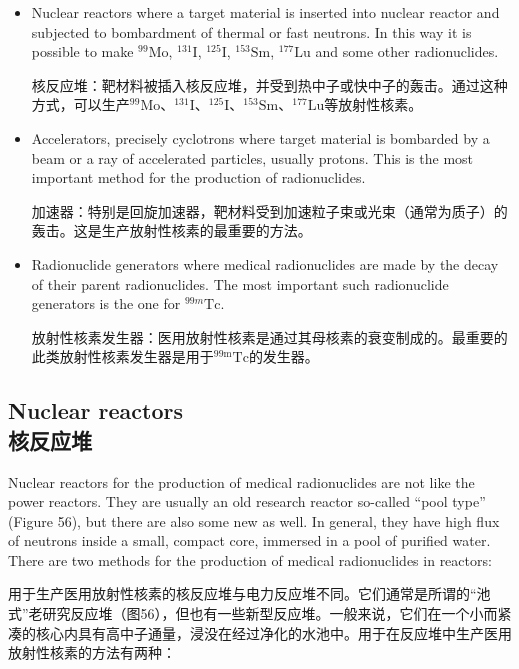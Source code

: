 \documentclass[dvipsnames, svgnames,a4paper,11pt]{article}
\begin{document}
\begin{itemize}
      \item Nuclear reactors where a target material is inserted into nuclear reactor and subjected to bombardment of thermal or fast neutrons. In this way it is possible to make $^{99}\mathrm{Mo}$, $^{131}\mathrm{I}$, $^{125}\mathrm{I}$, $^{153}\mathrm{Sm}$, $^{177}\mathrm{Lu}$ and some other radionuclides.

            核反应堆：靶材料被插入核反应堆，并受到热中子或快中子的轰击。通过这种方式，可以生产$^{99}\mathrm{Mo}$、$^{131}\mathrm{I}$、$^{125}\mathrm{I}$、$^{153}\mathrm{Sm}$、$^{177}\mathrm{Lu}$等放射性核素。

      \item Accelerators, precisely cyclotrons where target material is bombarded by a beam or a ray of accelerated particles, usually protons. This is the most important method for the production of radionuclides.

            加速器：特别是回旋加速器，靶材料受到加速粒子束或光束（通常为质子）的轰击。这是生产放射性核素的最重要的方法。

            
      \item Radionuclide generators where medical radionuclides are made by the decay of their parent radionuclides. The most important such radionuclide generators is the one for $^{99m}\mathrm{Tc}$.

            放射性核素发生器：医用放射性核素是通过其母核素的衰变制成的。最重要的此类放射性核素发生器是用于$^\text{99m}\mathrm{Tc}$的发生器。
\end{itemize}

\subsection{Nuclear reactors\\ 核反应堆}

Nuclear reactors for the production of medical radionuclides are not like the power reactors. They are usually an old research reactor so-called “pool type” (Figure 56), but there are also some new as well. In general, they have high flux of neutrons inside a small, compact core, immersed in a pool of purified water. There are two methods for the production of medical radionuclides in reactors:

用于生产医用放射性核素的核反应堆与电力反应堆不同。它们通常是所谓的“池式”老研究反应堆（图56），但也有一些新型反应堆。一般来说，它们在一个小而紧凑的核心内具有高中子通量，浸没在经过净化的水池中。用于在反应堆中生产医用放射性核素的方法有两种：
\end{document}
